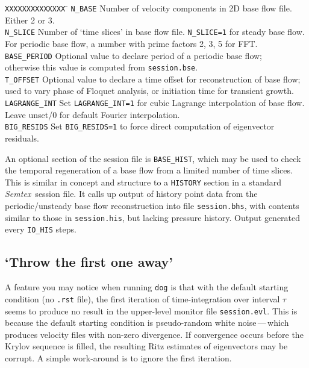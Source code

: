 \documentclass[11pt,a4paper]{report}
\newcommand{\Semtex}{\emph{Semtex}}
\begin{document}
\begin{tabbing}
\texttt{XXXXXXXXXXXXXX} \= \kill 
%
\texttt{N\_BASE}  \>
  Number of velocity components in 2D base flow file.  Either 2 or 3.\\
\texttt{N\_SLICE}  \>
  Number of `time slices' in base flow file. \verb+N_SLICE=1+ for 
  steady base flow.\\
  \> For periodic base flow, a number with prime factors 2, 3, 5 for FFT.\\
\texttt{BASE\_PERIOD}  \>
  Optional value to declare period of a periodic base flow;\\
  \>  otherwise this value is computed from \verb+session.bse+.\\
\texttt{T\_OFFSET}  \>
  Optional value to declare a time offset for reconstruction of base flow;\\
  \>  used to vary phase of Floquet analysis, or initiation time for
      transient growth.\\
\texttt{LAGRANGE\_INT} \>
  Set \verb+LAGRANGE_INT=1+ for cubic Lagrange interpolation of base flow.\\
  \> Leave unset/0 for default Fourier interpolation.\\
\texttt{BIG\_RESIDS} \>
  Set \verb+BIG_RESIDS=1+ to force direct computation of 
  eigenvector residuals.
\end{tabbing}

An optional section of the session file is \verb+BASE_HIST+, which may
be used to check the temporal regeneration of a base flow from a
limited number of time slices.  This is similar in concept and
structure to a \verb+HISTORY+ section in a standard \Semtex\ session
file. It calls up output of history point data from the
periodic/unsteady base flow reconstruction into file
\verb+session.bhs+, with contents similar to those in
\verb+session.his+, but lacking pressure history.  Output generated
every \verb+IO_HIS+ steps.

\subsection{`Throw the first one away'}

A feature you may notice when running \verb+dog+ is that with the
default starting condition (no \verb+.rst+ file), the first iteration
of time-integration over interval $\tau$ seems to produce no result in
the upper-level monitor file \verb+session.evl+.  This is because the
default starting condition is pseudo-random white noise\,---\,which
produces velocity files with non-zero divergence.  If convergence
occurs before the Krylov sequence is filled, the resulting Ritz
estimates of eigenvectors may be corrupt.  A simple work-around is to
ignore the first iteration.
\end{document}

